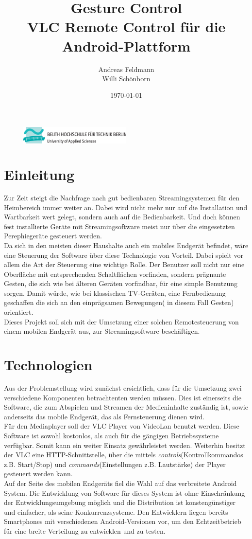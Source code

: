 \documentclass[a4paper]{article}
\title{Gesture Control \\ VLC Remote Control für die Android-Plattform}
\author{Andreas Feldmann \\ Willi Schönborn}
\date{\today}
\begin{document}
\begin{figure}[H]
\centering
\includegraphics[width=0.5\textwidth]{beuth.eps}
\maketitle
\end{figure}

\section*{Einleitung}
Zur Zeit steigt die Nachfrage nach gut bedienbaren Streamingsystemen für den Heimbereich immer weiter an. Dabei wird nicht mehr nur auf die Installation und Wartbarkeit wert gelegt, sondern auch auf die Bedienbarkeit. Und doch können fest installierte Geräte mit Streamingsoftware meist nur über die eingesetzten Perephiegeräte gesteuert werden. \\
Da sich in den meisten dieser Haushalte auch ein mobiles Endgerät befindet, wäre eine Steuerung der Software über diese Technologie von Vorteil. Dabei spielt vor allem die Art der Steuerung eine wichtige Rolle. Der Benutzer soll nicht nur eine Oberfläche mit entsprechenden Schaltflächen vorfinden, sondern prägnante Gesten, die sich wie bei älteren Geräten vorfindbar, für eine simple Benutzung sorgen. Damit würde, wie bei klassischen TV-Geräten, eine Fernbedienung geschaffen die sich an den einprägsamen Bewegungen( in diesem Fall Gesten) orientiert. \\
Dieses Projekt soll sich mit der Umsetzung einer solchen Remotesteuerung von einem mobilen Endgerät aus, zur Streamingsoftware beschäftigen.

\section*{Technologien}
Aus der Problemstellung wird zunächst ersichtlich, dass für die Umsetzung zwei verschiedene Komponenten betrachtenten werden müssen. Dies ist einerseits die Software, die zum Abspielen und Streamen der Medieninhalte zuständig ist, sowie anderseits das mobile Endgerät, das als Fernsteuerung dienen wird. \\
Für den Mediaplayer soll der VLC Player von VideoLan benutzt werden. Diese Software ist sowohl kostonlos, als auch für die gängigen Betriebssysteme verfügbar. Somit kann ein weiter Einsatz gewährleistet werden. Weiterhin besitzt der VLC eine HTTP-Schnittstelle, über die mittels \textit{controls}(Kontrollkommandos z.B. Start/Stop) und \textit{commands}(Einstellungen z.B. Lautstärke) der Player gesteuert werden kann. \\
Auf der Seite des mobilen Endgeräts fiel die Wahl auf das verbreitete Android System. Die Entwicklung von Software für dieses System ist ohne Einschränkung der Entwicklungsumgebung möglich und die Distribution ist konstengünstiger und einfacher, als seine Konkurrenzsysteme. Den Entwicklern liegen bereits Smartphones mit verschiedenen Android-Versionen vor, um den Echtzeitbetrieb für eine breite Verteilung zu entwicklen und zu testen.
\newpage
\end{document}
